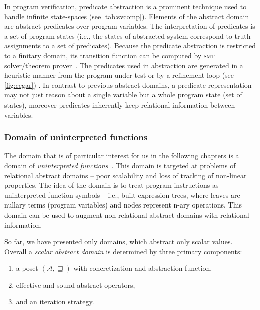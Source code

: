 In program verification, predicate abstraction \cite{Graf1997, Bjorner1997} is
a prominent technique used to handle infinite state-spaces (see
\autoref{tab:svcomp}). Elements of the abstract domain are abstract predicates
over program variables. The interpretation of predicates is a set of program
states (i.e., the states of abstracted system correspond to truth assignments
to a set of predicates). Because the predicate abstraction is restricted to a
finitary domain, its transition function can be computed by \textsc{smt} solver/theorem
prover~\cite{Cousot2003, Ball2001}. The predicates used in abstraction are
generated in a heuristic manner from the program under test or by a refinement
loop (see \autoref{fig:cegar}) \cite{Flanagan2002}. In contrast to previous
abstract domains, a predicate representation may not just reason about a single
variable but a whole program state (set of states), moreover predicates
inherently keep relational information between variables.

\subsubsection{Domain of uninterpreted functions}

The domain that is of particular interest for us in the following chapters is a
domain of \emph{uninterpreted functions}~\cite{Gange2016}. This domain is targeted
at problems of relational abstract domains -- poor scalability and loss of
tracking of non-linear properties. The idea of the domain is to treat program
instructions as uninterpreted function symbols -- i.e., built expression trees,
where leaves are nullary terms (program variables) and nodes represent n-ary
operations. This domain can be used to augment non-relational abstract domains
with relational information.

\bigskip
\prule
\bigskip

So far, we have presented only domains, which abstract only scalar values.
Overall a \emph{scalar abstract domain} is determined by three primary
components:

\label{sec:ingredients}
\begin{enumerate}
    \itemsep0em
    \item a poset $(\mathcal{A}, \sqsupseteq)$ with concretization and abstraction function,
    \item effective and sound abstract operators,
    \item and an iteration strategy.
\end{enumerate}

